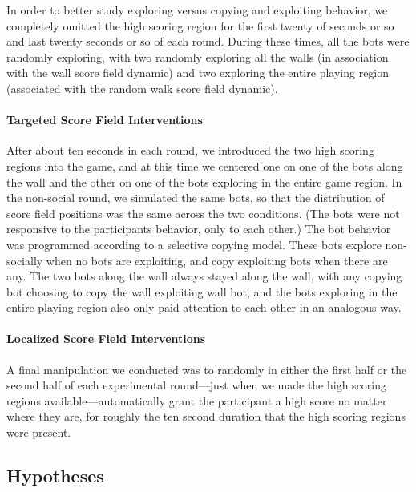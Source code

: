 \documentclass[12pt,letterpaper]{article}
\begin{document}
In order to better study exploring versus copying and exploiting behavior, we completely omitted the high scoring region for the first twenty of seconds or so and last twenty seconds or so of each round. During these times, all the bots were randomly exploring, with two randomly exploring all the walls (in association with the wall score field dynamic) and two exploring the entire playing region (associated with the random walk score field dynamic). 

\paragraph{Targeted Score Field Interventions}

After about ten seconds in each round, we introduced the two high scoring regions into the game, and at this time we centered one on one of the bots along the wall and the other on one of the bots exploring in the entire game region. In the non-social round, we simulated the same bots, so that the distribution of score field positions was the same across the two conditions. (The bots were not responsive to the participants behavior, only to each other.) The bot behavior was programmed according to a selective copying model. These bots explore non-socially when no bots are exploiting, and copy exploiting bots when there are any. The two bots along the wall always stayed along the wall, with any copying bot choosing to copy the wall exploiting wall bot, and the bots exploring in the entire playing region also only paid attention to each other in an analogous way.

\paragraph{Localized Score Field Interventions}

A final manipulation we conducted was to randomly in either the first half or the second half of each experimental round---just when we made the high scoring regions available---automatically grant the participant a high score no matter where they are, for roughly the ten second duration that the high scoring regions were present.


\subsection{Hypotheses}
\end{document}
